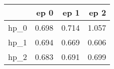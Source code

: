 \begin{tabular}{lrrr}
\toprule
{} &   ep 0 &   ep 1 &   ep 2 \\
\midrule
hp\_0 &  0.698 &  0.714 &  1.057 \\
hp\_1 &  0.694 &  0.669 &  0.606 \\
hp\_2 &  0.683 &  0.691 &  0.699 \\
\bottomrule
\end{tabular}
